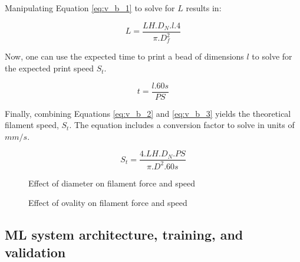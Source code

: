 \documentclass[main.tex]{subfiles}
\begin{document}
Manipulating Equation \ref{eq:v_b_1} to solve for $L$ results in:

\begin{equation} \label{eq:v_b_2}
	L = \frac{LH. D_{N}. l. 4}{\pi . D_{f}^2}
\end{equation}

Now, one can use the expected time to print a bead of dimensions $l$ to solve for the expected print speed $S_{t}$.

\begin{equation} \label{eq:v_b_3}
	t = \frac{l. 60 s}{PS}
\end{equation}

Finally, combining Equations \ref{eq:v_b_2} and \ref{eq:v_b_3} yields the theoretical filament speed, $S_{t}$. The equation includes a conversion factor to solve in units of $mm/s$.

\begin{equation} \label{eq:v_b_4}
	S_{t}=\frac{4. LH. D_{N}. PS}{\pi . D^2 . 60s}
\end{equation}


\begin{figure}[h]
	\center
	\linebreak
	\caption{Effect of diameter on filament force and speed} \label{fig:dia_f_sp}
\end{figure}

\begin{figure}[h]
	\center
	\linebreak
	\caption{Effect of ovality on filament force and speed} \label{fig:ov_f_sp}
\end{figure}

\subsection{ML system architecture, training, and validation}\label{ssec:MLA}
\end{document}

